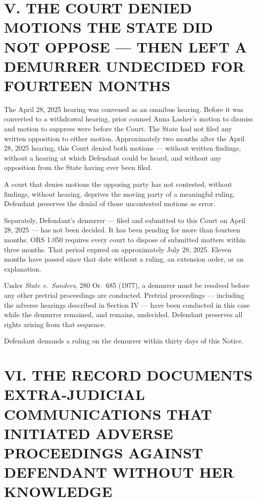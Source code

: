 \documentclass[12pt,letterpaper]{article}
\begin{document}

\section*{V. THE COURT DENIED MOTIONS THE STATE DID NOT OPPOSE --- THEN
LEFT A DEMURRER UNDECIDED FOR FOURTEEN MONTHS}

The April 28, 2025 hearing was convened as an omnibus hearing. Before it was
converted to a withdrawal hearing, prior counsel Anna Lasher's motion to dismiss
and motion to suppress were before the Court. The State had not filed any written
opposition to either motion. Approximately two months after the April 28, 2025
hearing, this Court denied both motions --- without written findings, without a
hearing at which Defendant could be heard, and without any opposition from the
State having ever been filed.

A court that denies motions the opposing party has not contested, without
findings, without hearing, deprives the moving party of a meaningful ruling.
Defendant preserves the denial of those uncontested motions as error.

Separately, Defendant's demurrer --- filed and submitted to this Court on
April 28, 2025 --- has not been decided. It has been pending for more than
fourteen months. ORS 1.050 requires every court to dispose of submitted matters
within three months. That period expired on approximately July 28, 2025. Eleven
months have passed since that date without a ruling, an extension order, or an
explanation.

Under \textit{State v.\ Sanders}, 280 Or.\ 685 (1977), a demurrer must be
resolved before any other pretrial proceedings are conducted. Pretrial proceedings
--- including the adverse hearings described in Section IV --- have been conducted
in this case while the demurrer remained, and remains, undecided. Defendant
preserves all rights arising from that sequence.

Defendant demands a ruling on the demurrer within thirty days of this Notice.


\section*{VI. THE RECORD DOCUMENTS EXTRA-JUDICIAL COMMUNICATIONS THAT
INITIATED ADVERSE PROCEEDINGS AGAINST DEFENDANT WITHOUT HER KNOWLEDGE}
\end{document}
